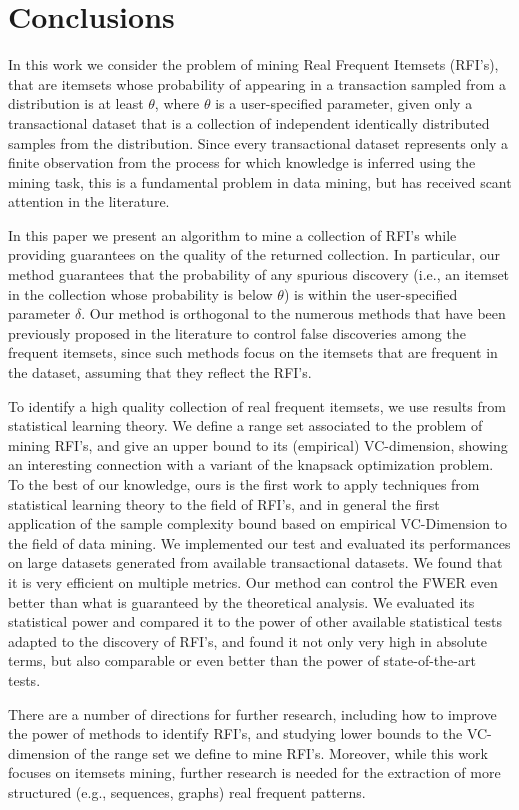 \section{Conclusions}\label{sec:concl}

In this work we consider the problem of mining Real Frequent Itemsets (RFI's), 
that are itemsets whose probability of appearing in a transaction sampled from a
distribution is at least $\theta$, where $\theta$ is a user-specified parameter,
given only a transactional dataset that is a collection of independent
identically distributed samples from the distribution. Since every transactional 
dataset represents only a finite observation from the process for which
knowledge is inferred using the mining task, this is a fundamental
problem in data mining, but has received scant attention in the literature.

In this paper we present an algorithm to mine a collection of RFI's while providing guarantees on the quality of the returned collection. 
In particular, our method
guarantees that the probability of any spurious discovery (i.e., an itemset in the collection whose probability is below $\theta$)
 is within the user-specified parameter $\delta$. Our method is orthogonal to the numerous methods that have been  previously proposed in the literature to control false discoveries
 among the frequent itemsets, since such methods focus on the itemsets that are frequent in the dataset, assuming that they reflect the RFI's.
 
To identify a high quality collection of real frequent itemsets, we use results from statistical learning theory. We define a range set associated to the problem of mining RFI's,  and give an
upper bound to its (empirical) VC-dimension, showing an interesting connection
with a variant of the knapsack optimization problem.
To the best of our knowledge, ours is the first work to apply techniques from statistical learning theory to the field of RFI's, and in general the first application of the sample complexity
bound based on empirical VC-Dimension to the field of data mining. We
implemented our test and evaluated its performances on large datasets generated
from available transactional datasets. We found that it is very efficient on
multiple metrics. Our method can control the FWER even better than what is
guaranteed by the theoretical analysis. We evaluated its statistical power and
compared it to the power of other available statistical tests adapted to the
discovery of RFI's, and found it not only very high in absolute terms, but also
comparable or even better than the power of state-of-the-art tests.

There are a number of directions for further research, including how to improve the power of methods to identify RFI's, and studying lower bounds to the VC-dimension of the range set we define to mine RFI's.
Moreover, while this work focuses on itemsets mining, further research is needed for the extraction of more structured (e.g., sequences, graphs) real frequent patterns.
 

